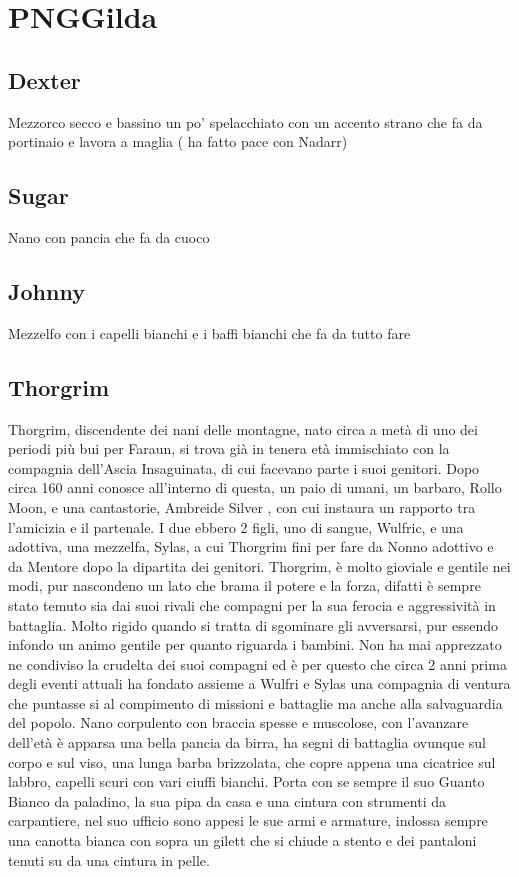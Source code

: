 \documentclass{article}
\begin{document}
\section{PNGGilda}
\subsection{Dexter}
Mezzorco secco e bassino un po' spelacchiato con un accento strano che fa da portinaio e lavora a maglia ( ha fatto pace con Nadarr)
\subsection{Sugar}
Nano con pancia che fa da cuoco
\subsection{Johnny}
Mezzelfo con i capelli bianchi e i baffi bianchi che fa da tutto fare
\subsection{Thorgrim}
Thorgrim, discendente dei nani delle montagne, nato circa a metà di uno dei periodi più bui per Faraun, si trova già in tenera età immischiato con la compagnia dell'Ascia Insaguinata, di cui facevano parte i suoi genitori. Dopo circa 160 anni conosce all'interno di questa, un paio di umani, un barbaro, Rollo Moon, e una cantastorie, Ambreide Silver , con cui instaura un rapporto tra l'amicizia e il partenale. I due ebbero 2 figli, uno di sangue, Wulfric, e una adottiva, una mezzelfa, Sylas, a cui Thorgrim fini per fare da Nonno adottivo e da Mentore dopo la dipartita dei genitori. Thorgrim, è molto gioviale e gentile nei modi, pur nascondeno un lato che brama il potere e la forza, difatti è sempre stato temuto sia dai suoi rivali che compagni per  la sua ferocia e aggressività in battaglia. Molto rigido quando si tratta di sgominare gli avversarsi, pur essendo infondo un animo gentile per quanto riguarda i bambini. Non ha mai apprezzato ne condiviso la crudelta dei suoi compagni ed è per questo che circa 2 anni prima degli eventi attuali ha fondato assieme a Wulfri e Sylas una compagnia di ventura  che puntasse si al compimento di missioni e battaglie ma anche alla salvaguardia del popolo. Nano corpulento con braccia spesse e muscolose, con l'avanzare dell'età è apparsa una bella pancia da birra, ha segni di battaglia ovunque sul corpo e sul viso, una lunga barba brizzolata, che copre appena una cicatrice sul labbro, capelli scuri con vari ciuffi bianchi. Porta con se sempre il suo Guanto Bianco da paladino, la sua pipa da casa e una cintura con strumenti da carpantiere, nel suo ufficio sono appesi le sue armi e armature, indossa sempre una canotta bianca con sopra un gilett che si chiude a stento e dei pantaloni tenuti su da una cintura in pelle.
\end{document}
